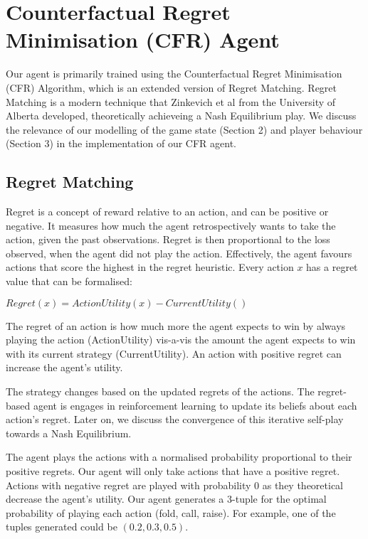 \documentclass{article}
\begin{document}
\section{Counterfactual Regret Minimisation (CFR) Agent}

Our agent is primarily trained using the Counterfactual Regret Minimisation (CFR) Algorithm, which is an extended version of Regret Matching. Regret Matching is a modern technique that Zinkevich et al from the University of Alberta developed, theoretically achieveing a Nash Equilibrium play. We discuss the relevance of our modelling of the game state (Section 2) and player behaviour (Section 3) in the implementation of our CFR agent.

\subsection{Regret Matching}

Regret is a concept of reward relative to an action, and can be positive or negative. It measures how much the agent retrospectively wants to take the action, given the past observations. Regret is then proportional to the loss observed, when the agent did not play the action. Effectively, the agent favours actions that score the highest in the regret heuristic. Every action $x$ has a regret value that can be formalised:

\begin{center}
$Regret(x) = ActionUtility(x) - CurrentUtility()$
\end{center}

The regret of an action is how much more the agent expects to win by always playing the action (ActionUtility) vis-a-vis the amount the agent expects to win with its current strategy (CurrentUtility). An action with positive regret can increase the agent's utility.

The strategy changes based on the updated regrets of the actions. The regret-based agent is engages in reinforcement learning to update its beliefs about each action's regret. Later on, we discuss the convergence of this iterative self-play towards a Nash Equilibrium.

The agent plays the actions with a normalised probability proportional to their positive regrets. Our agent will only take actions that have a positive regret. Actions with negative regret are played with probability $0$ as they theoretical decrease the agent's utility. Our agent generates a $3$-tuple for the optimal probability of playing each action (fold, call, raise). For example, one of the tuples generated could be $(0.2, 0.3, 0.5)$.
\end{document}
